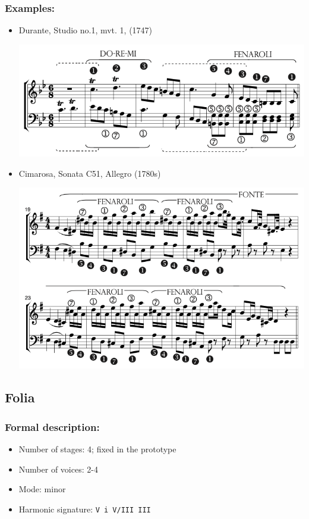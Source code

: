 \documentclass[11pt, openany]{article}
\begin{document}
\subsubsection{Examples:}
\begin{itemize}
\item Durante, Studio no.1, mvt. 1, (1747)
\begin{center}
\includegraphics[scale=0.5]{durante1.png}
\end{center}
\item Cimarosa, Sonata C51, Allegro (1780s)
\begin{center}
\includegraphics[scale=0.5]{cimarosa51.png}
\end{center}
\end{itemize}


	\subsection{Folia}
	
\subsubsection{Formal description:}
\begin{itemize}
\item Number of stages: 4; fixed in the prototype
\item Number of voices: 2-4
\item Mode: minor
\item Harmonic signature: \texttt{V i V/III III}
\end{itemize}
\end{document}
